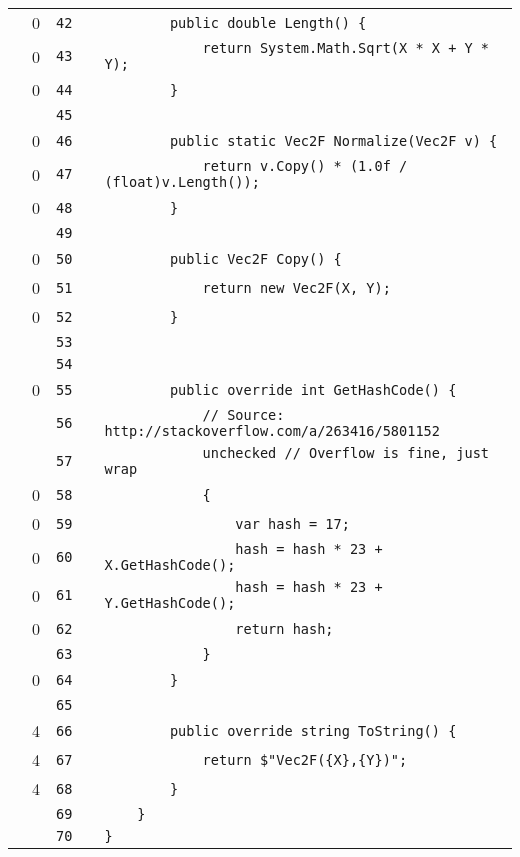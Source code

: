 \documentclass[a4paper,landscape,10pt]{article}
\begin{document}
\begin{longtable}[l]{lrrll}
\cellcolor{red} & 0 & \verb~42~ & & \verb~        public double Length() {~\\
\cellcolor{red} & 0 & \verb~43~ & & \verb~            return System.Math.Sqrt(X * X + Y * Y);~\\
\cellcolor{red} & 0 & \verb~44~ & & \verb~        }~\\
\cellcolor{gray} &  & \verb~45~ & & \verb~~\\
\cellcolor{red} & 0 & \verb~46~ & & \verb~        public static Vec2F Normalize(Vec2F v) {~\\
\cellcolor{red} & 0 & \verb~47~ & & \verb~            return v.Copy() * (1.0f / (float)v.Length());~\\
\cellcolor{red} & 0 & \verb~48~ & & \verb~        }~\\
\cellcolor{gray} &  & \verb~49~ & & \verb~~\\
\cellcolor{red} & 0 & \verb~50~ & & \verb~        public Vec2F Copy() {~\\
\cellcolor{red} & 0 & \verb~51~ & & \verb~            return new Vec2F(X, Y);~\\
\cellcolor{red} & 0 & \verb~52~ & & \verb~        }~\\
\cellcolor{gray} &  & \verb~53~ & & \verb~~\\
\cellcolor{gray} &  & \verb~54~ & & \verb~~\\
\cellcolor{red} & 0 & \verb~55~ & & \verb~        public override int GetHashCode() {~\\
\cellcolor{gray} &  & \verb~56~ & & \verb~            // Source: http://stackoverflow.com/a/263416/5801152~\\
\cellcolor{gray} &  & \verb~57~ & & \verb~            unchecked // Overflow is fine, just wrap~\\
\cellcolor{red} & 0 & \verb~58~ & & \verb~            {~\\
\cellcolor{red} & 0 & \verb~59~ & & \verb~                var hash = 17;~\\
\cellcolor{red} & 0 & \verb~60~ & & \verb~                hash = hash * 23 + X.GetHashCode();~\\
\cellcolor{red} & 0 & \verb~61~ & & \verb~                hash = hash * 23 + Y.GetHashCode();~\\
\cellcolor{red} & 0 & \verb~62~ & & \verb~                return hash;~\\
\cellcolor{gray} &  & \verb~63~ & & \verb~            }~\\
\cellcolor{red} & 0 & \verb~64~ & & \verb~        }~\\
\cellcolor{gray} &  & \verb~65~ & & \verb~~\\
\cellcolor{green} & 4 & \verb~66~ & & \verb~        public override string ToString() {~\\
\cellcolor{green} & 4 & \verb~67~ & & \verb~            return $"Vec2F({X},{Y})";~\\
\cellcolor{green} & 4 & \verb~68~ & & \verb~        }~\\
\cellcolor{gray} &  & \verb~69~ & & \verb~    }~\\
\cellcolor{gray} &  & \verb~70~ & & \verb~}~\\
\end{longtable}
\newpage
\end{document}
